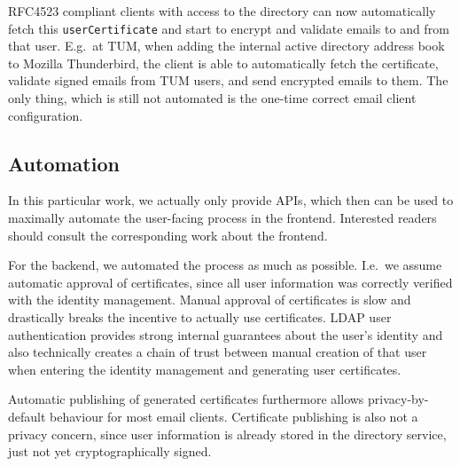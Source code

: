 RFC4523 compliant clients with access to the directory can now automatically fetch this \lstinline{userCertificate} and
start to encrypt and validate emails to and from that user.
E.g.\ at TUM, when adding the internal active directory address book to Mozilla Thunderbird, the client is able to
automatically fetch the certificate, validate signed emails from TUM users, and send encrypted emails to them.
The only thing, which is still not automated is the one-time correct email client configuration.

\subsection*{Automation}
In this particular work, we actually only provide APIs, which then can be used to maximally automate the user-facing
process in the frontend.
Interested readers should consult the corresponding work about the frontend.

For the backend, we automated the process as much as possible.
I.e.\ we assume automatic approval of certificates, since all user information was correctly verified with the identity
management.
Manual approval of certificates is slow and drastically breaks the incentive to actually use certificates.
LDAP user authentication provides strong internal guarantees about the user's identity and also technically creates a
chain of trust between manual creation of that user when entering the identity management and generating user
certificates.

Automatic publishing of generated certificates furthermore allows privacy-by-default behaviour for most email clients.
Certificate publishing is also not a privacy concern, since user information is already stored in the directory service,
just not yet cryptographically signed.
